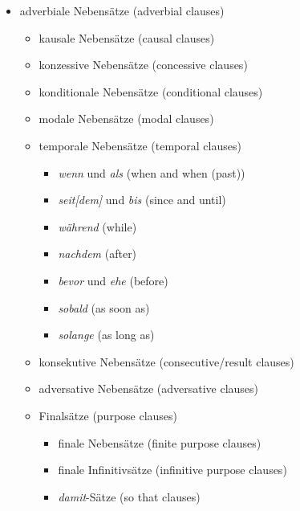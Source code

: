 \documentclass[a4paper]{article}
\begin{document}
\begin{itemize}
\begin{itemize}
                \item adverbiale Nebensätze {\small (adverbial clauses)}
                \begin{itemize}
                    \item kausale Nebensätze {\small (causal clauses)}
                    \item konzessive Nebensätze {\small (concessive clauses)}
                    \item konditionale Nebensätze {\small (conditional clauses)}
                    \item modale Nebensätze {\small (modal clauses)}
                    \item temporale Nebensätze {\small (temporal clauses)}
                    \begin{itemize}
                        \item \textit{wenn} und \textit{als} {\small (when and when (past))}
                        \item \textit{seit[dem]} und \textit{bis} {\small (since and until)}
                        \item \textit{während} {\small (while)}
                        \item \textit{nachdem} {\small (after)}
                        \item \textit{bevor} und \textit{ehe} {\small (before)}
                        \item \textit{sobald} {\small (as soon as)}
                        \item \textit{solange} {\small (as long as)}
                    \end{itemize}
                    \item konsekutive Nebensätze {\small (consecutive/result clauses)}
                    \item adversative Nebensätze {\small (adversative clauses)}
                    \item Finalsätze {\small (purpose clauses)}
                    \begin{itemize}
                        \item finale Nebensätze {\small (finite purpose clauses)}
                        \item finale Infinitivsätze {\small (infinitive purpose clauses)}
                        \item \textit{damit}-Sätze {\small (so that clauses)}
                    \end{itemize}
                \end{itemize}
                

\end{itemize}
\end{itemize}
\end{document}
